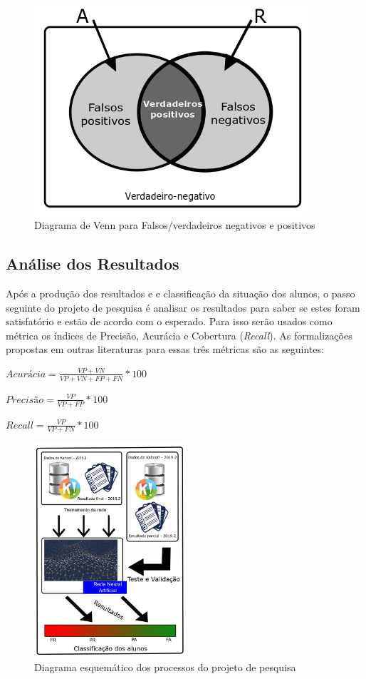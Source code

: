 \documentclass[
	12pt,				%
	openright,			%
	oneside,
	a4paper,			%
	english,			%
	french,				%
	spanish,			%
	brazil,				%
	]{abntex2}
\begin{document}
\begin{figure}
    \centering
    \includegraphics[width=0.9\textwidth]{Modelo_Projeto_Pesquisa_UFG_REJ_BCC/DiagramaVenn.png}
    \caption{Diagrama de Venn para Falsos/verdadeiros negativos e positivos}
    \label{fig:Venn}
\end{figure}

\subsection{Análise dos Resultados}
\label{ss:analise}
Após a produção dos resultados e e classificação da situação dos alunos, o passo seguinte do projeto de pesquisa é analisar os resultados para saber se estes foram satisfatório e estão de acordo com o esperado. Para isso serão usados como métrica os índices de Precisão, Acurácia e Cobertura (\textit{Recall}). As formalizações propostas em outras literaturas para essas três métricas são as seguintes:


$Acurácia = \frac{VP+VN}{VP+VN+FP+FN}*100$

$Precisão = \frac{VP}{VP+FP}*100$

$\textit{Recall} = \frac{VP}{VP+FN}*100$

\begin{figure}
    \centering
    \includegraphics[width=0.5\textwidth]{Modelo_Projeto_Pesquisa_UFG_REJ_BCC/ProcessoMetodologico.png}
    \caption{Diagrama esquemático dos processos do projeto de pesquisa}
    \label{fig:processo}
\end{figure}
\end{document}
